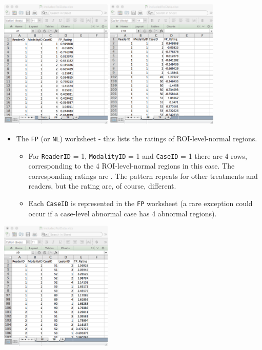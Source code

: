 \documentclass[]{book}
\providecommand{\tightlist}{%
  \setlength{\itemsep}{0pt}\setlength{\parskip}{0pt}}
\begin{document}
\includegraphics[width=0.4\textwidth,height=\textheight]{images/ROI-FP-1.png}
\includegraphics[width=0.4\textwidth,height=\textheight]{images/ROI-FP-2.png}

\begin{itemize}
\tightlist
\item
  The \texttt{FP} (or \texttt{NL}) worksheet - this lists the ratings of ROI-level-normal regions.

  \begin{itemize}
  \tightlist
  \item
    For \texttt{ReaderID} = 1, \texttt{ModalityID} = 1 and \texttt{CaseID} = 1 there are 4 rows, corresponding to the 4 ROI-level-normal regions in this case. The corresponding ratings are . The pattern repeats for other treatments and readers, but the rating are, of course, different.\\
  \item
    Each \texttt{CaseID} is represented in the \texttt{FP} worksheet (a rare exception could occur if a case-level abnormal case has 4 abnormal regions).
  \end{itemize}
\end{itemize}

\includegraphics[width=0.4\textwidth,height=\textheight]{images/ROI-TP-1.png}
\end{document}
